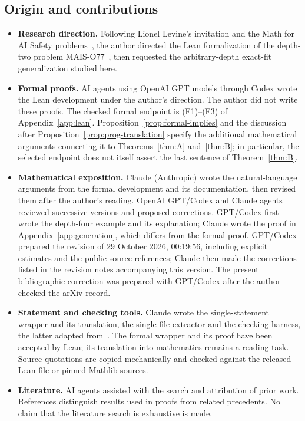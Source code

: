 \documentclass[11pt,a4paper]{article}
\theoremstyle{definition}
\theoremstyle{remark}
\numberwithin{equation}{section}
\begin{document}
\subsection*{Origin and contributions}
\begin{itemize}
\item \textbf{Research direction.} Following Lionel Levine's invitation and the Math for AI Safety problems~\cite{levine-mais,mais-repo}, the author directed the Lean formalization of the depth-two problem MAIS-O77~\cite{mais-o77,feld-o77}, then requested the arbitrary-depth exact-fit generalization studied here.
\item \textbf{Formal proofs.} AI agents using OpenAI GPT models through Codex wrote the Lean development under the author's direction. The author did not write these proofs. The checked formal endpoint is (F1)--(F3) of Appendix~\ref{app:lean}. Proposition~\ref{prop:formal-implies} and the discussion after Proposition~\ref{prop:prog-translation} specify the additional mathematical arguments connecting it to Theorems~\ref{thm:A} and~\ref{thm:B}; in particular, the selected endpoint does not itself assert the last sentence of Theorem~\ref{thm:B}.
\item \textbf{Mathematical exposition.} Claude (Anthropic) wrote the natural-language arguments from the formal development and its documentation, then revised them after the author's reading. OpenAI GPT/Codex and Claude agents reviewed successive versions and proposed corrections. GPT/Codex first wrote the depth-four example and its explanation; Claude wrote the proof in Appendix~\ref{app:generation}, which differs from the formal proof. GPT/Codex prepared the revision of 29 October 2026, 00:19:56, including explicit estimates and the public source references; Claude then made the corrections listed in the revision notes accompanying this version. The present bibliographic correction was prepared with GPT/Codex after the author checked the arXiv record.
\item \textbf{Statement and checking tools.} Claude wrote the single-statement wrapper and its translation, the single-file extractor and the checking harness, the latter adapted from~\cite{feld-o77}. The formal wrapper and its proof have been accepted by Lean; its translation into mathematics remains a reading task. Source quotations are copied mechanically and checked against the released Lean file or pinned Mathlib sources.
\item \textbf{Literature.} AI agents assisted with the search and attribution of prior work. References distinguish results used in proofs from related precedents. No claim that the literature search is exhaustive is made.
\end{itemize}
\end{document}

